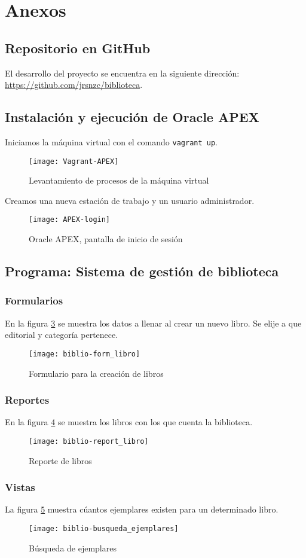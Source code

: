 \section{Anexos}
\subsection{Repositorio en GitHub}
El desarrollo del proyecto se encuentra en la siguiente dirección: \url{https://github.com/jrsnzc/biblioteca}.

\subsection{Instalación y ejecución de Oracle APEX}
Iniciamos la máquina virtual con el comando \lstinline$vagrant up$.
\begin{figure}[H]
  \centering
  \texttt{[image: Vagrant-APEX]}
  \caption{Levantamiento de procesos de la máquina virtual} 
  \label{fig:vagrant-apex}
\end{figure}

Creamos una nueva estación de trabajo y un usuario administrador.
\begin{figure}[H]
  \centering
  \texttt{[image: APEX-login]}
  \caption{Oracle APEX, pantalla de inicio de sesión}
  \label{fig:apex-login}
\end{figure}

\subsection{Programa: Sistema de gestión de biblioteca}
\subsubsection{Formularios}
En la figura \ref{fig:biblio-form_libro} se muestra los datos a llenar al crear un nuevo libro. Se elije a que editorial y categoría pertenece.
\begin{figure}[H]
  \centering
  \texttt{[image: biblio-form\_libro]}
  \caption{Formulario para la creación de libros}
  \label{fig:biblio-form_libro}
\end{figure}
\subsubsection{Reportes}
En la figura \ref{fig:biblio-report_libro} se muestra los libros con los que cuenta la biblioteca.
\begin{figure}[H]
  \centering
  \texttt{[image: biblio-report\_libro]}
  \caption{Reporte de libros}
  \label{fig:biblio-report_libro}
\end{figure}
\subsubsection{Vistas}
La figura \ref{fig:biblio-busqueda_ejemplares} muestra cúantos ejemplares existen para un determinado libro.
\begin{figure}[H]
  \centering
  \texttt{[image: biblio-busqueda\_ejemplares]}
  \caption{Búsqueda de ejemplares}
  \label{fig:biblio-busqueda_ejemplares}
\end{figure}